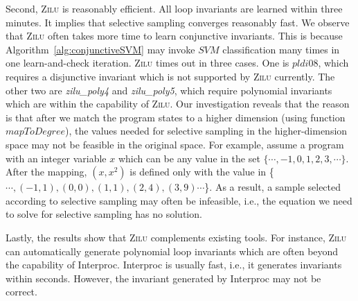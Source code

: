 Second, \textsc{Zilu} is reasonably efficient. All loop invariants are learned within three minutes. 
It implies that selective sampling converges reasonably fast.
We observe that \textsc{Zilu} often takes more time to learn conjunctive invariants. 
This is because Algorithm~\ref{alg:conjunctiveSVM} may invoke $\mathit{SVM}$ classification many times in one learn-and-check iteration.
\textsc{Zilu} times out in three cases. One is $pldi08$, which requires a disjunctive invariant which is not supported by \textsc{Zilu} currently. 
The other two are \emph{zilu\_poly4} and \emph{zilu\_poly5}, which require polynomial invariants which are within the capability of \textsc{Zilu}. 
Our investigation reveals that the reason is that after we match the program states to a higher dimension (using function $\mathit{mapToDegree}$), 
the values needed for selective sampling in the higher-dimension space may not be feasible in the original space. 
For example, assume a program with an integer variable $x$ which can be any value in the set $\{\cdots, -1, 0,  1, 2, 3, \cdots\}$. 
After the mapping, $(x, x^2)$ is defined only with the value in \{$\cdots, (-1,1), (0,0), (1,1), (2, 4), (3, 9)\cdots$\}. 
As a result, a sample selected according to selective sampling may often be infeasible, i.e., the equation we need to solve for selective sampling has no solution.


Lastly, the results show that \textsc{Zilu} complements existing tools. For instance, \textsc{Zilu} can automatically generate polynomial loop invariants
which are often beyond the capability of Interproc. Interproc is usually fast, i.e., it generates invariants within seconds. However, the invariant generated by Interproc may not be correct.

